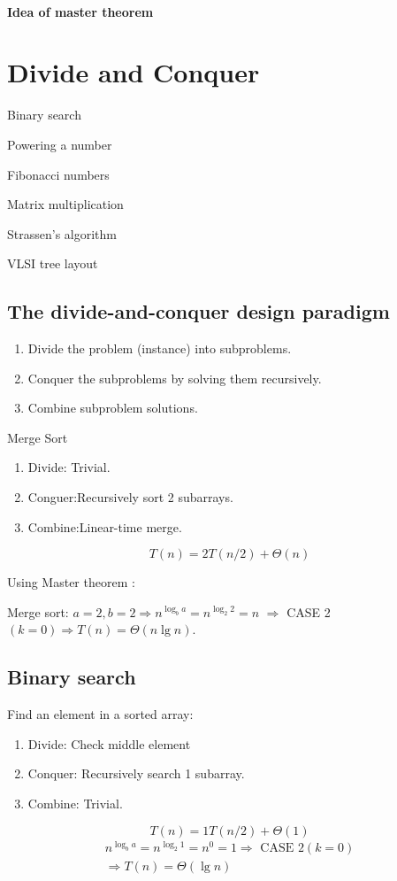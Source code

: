 \documentclass[11pt,toc=twocol]{elegantbook}
\begin{document}
\subsubsection{Idea of master theorem}

\chapter{Divide and Conquer}

\begin{introduction}
    \item Binary search
    \item Powering a number
    \item Fibonacci numbers
    \item Matrix multiplication
    \item Strassen’s algorithm
    \item VLSI tree layout
\end{introduction}

\section{The divide-and-conquer design paradigm}
\begin{enumerate}
    \item Divide the problem (instance) into subproblems.
    \item Conquer the subproblems by solving them recursively.
    \item Combine subproblem solutions.
\end{enumerate}
\begin{note}
Merge Sort
\begin{enumerate}
    \item Divide: Trivial.
    \item Conguer:Recursively sort 2 subarrays.
    \item Combine:Linear-time merge.
\end{enumerate}
$$
T(n)=2 T(n / 2)+\Theta(n)
$$

Using Master theorem :

Merge sort: $a=2, b=2 \Rightarrow n^{\log _{b} a}=n^{\log _{2} 2}=n$ $\Rightarrow$ CASE 2 $(k=0) \Rightarrow T(n)=\Theta(n \lg n)$.
\end{note}
\section{Binary search}
Find an element in a sorted array:
\begin{enumerate}
    \item Divide: Check middle element
    \item Conquer: Recursively search 1 subarray.
    \item Combine: Trivial.
\end{enumerate}
$$
T(n)=1 T(n / 2)+\Theta(1)
$$
$$
\begin{gathered}
n^{\log _{b} a}=n^{\log _{2} 1}=n^{0}=1 \Rightarrow \text { CASE } 2(k=0) \\
\Rightarrow T(n)=\Theta(\lg n)
\end{gathered}
$$
\end{document}
